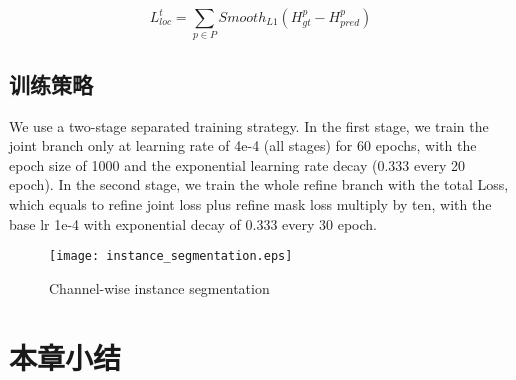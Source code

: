 \begin{equation}
\label{mask_loc_loss}
L_{loc}^t =  \sum_{p \in P} Smooth_{L1}( H^{p}_{gt} - H^{p}_{pred} )
\end{equation}

\subsection{训练策略}
\label{subsec:trainingstrategy}
We use a two-stage separated training strategy. In the first stage, we train the joint branch only at learning rate of 4e-4 (all stages) for 60 epochs, with the epoch size of 1000 and the exponential learning rate decay (0.333 every 20 epoch). In the second stage, we train the whole refine branch with the total Loss, which equals to refine joint loss plus refine mask loss multiply by ten, with the base lr 1e-4 with exponential decay of 0.333 every 30 epoch.


\begin{figure}[htbp]
	\centering
	\texttt{[image: instance\_segmentation.eps]}
	\caption{Channel-wise instance segmentation}
	\label{fig:chInsSeg}
\end{figure}

\section{本章小结}
